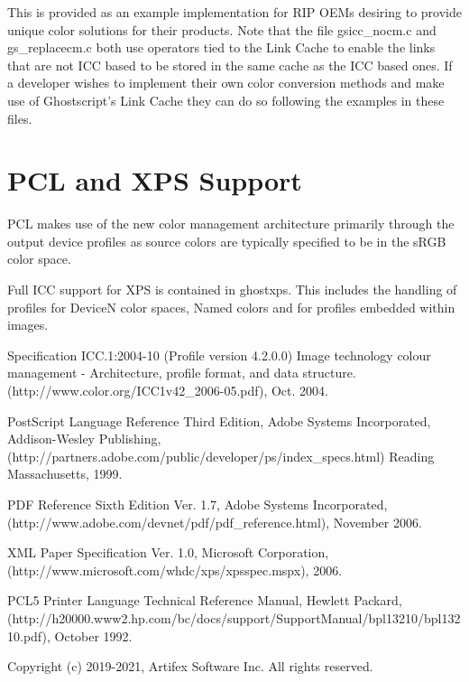 \documentclass[12pt,notitlepage]{article}
\begin{document}
This is provided as an example implementation for RIP OEMs desiring to provide unique color solutions for their products.
Note that the file gsicc\_nocm.c and gs\_replacecm.c both use operators tied to the Link Cache to enable the links that are not ICC based to be stored in the same cache as the ICC based ones.  If a developer wishes to implement their own color conversion methods and make use of Ghostscript's Link Cache they can do so following the examples in these files.

\section{PCL and XPS Support}

PCL\cite{PCL} makes use of the new color management architecture primarily through the output device profiles as source colors are typically specified to be in the sRGB color space.

Full ICC support for XPS\cite{XPS} is contained in ghostxps. This includes the handling of profiles for DeviceN color spaces, Named colors and for profiles embedded within images.

\begin{thebibliography}{99}

 Specification ICC.1:2004-10 (Profile version 4.2.0.0) Image technology colour management - Architecture, profile format, and data structure.
(http://www.color.org/ICC1v42\_2006-05.pdf), Oct. 2004.

 PostScript Language Reference Third Edition, Adobe Systems Incorporated, Addison-Wesley Publishing, (http://partners.adobe.com/public/developer/ps/index\_specs.html)
Reading Massachusetts, 1999.

 PDF Reference Sixth Edition Ver. 1.7, Adobe Systems Incorporated, (http://www.adobe.com/devnet/pdf/pdf\_reference.html), November 2006.

 XML Paper Specification Ver. 1.0, Microsoft Corporation, (http://www.microsoft.com/whdc/xps/xpsspec.mspx), 2006.

 PCL5 Printer Language Technical Reference Manual, Hewlett Packard, (http://h20000.www2.hp.com/bc/docs/support/SupportManual/bpl13210/bpl13210.pdf), October 1992.

\end{thebibliography}

\vspace*{1.25in}
Copyright (c) 2019-2021, Artifex Software Inc. All rights reserved.
\end{document}
